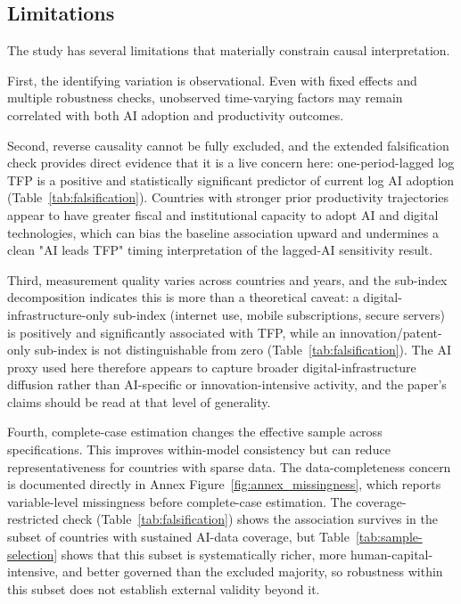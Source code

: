 \subsection{Limitations}

The study has several limitations that materially constrain causal interpretation.

First, the identifying variation is observational. Even with fixed effects and multiple robustness checks, unobserved time-varying factors may remain correlated with both AI adoption and productivity outcomes.

Second, reverse causality cannot be fully excluded, and the extended falsification check provides direct evidence that it is a live concern here: one-period-lagged log TFP is a positive and statistically significant predictor of current log AI adoption (Table~\ref{tab:falsification}). Countries with stronger prior productivity trajectories appear to have greater fiscal and institutional capacity to adopt AI and digital technologies, which can bias the baseline association upward and undermines a clean "AI leads TFP" timing interpretation of the lagged-AI sensitivity result.

Third, measurement quality varies across countries and years, and the sub-index decomposition indicates this is more than a theoretical caveat: a digital-infrastructure-only sub-index (internet use, mobile subscriptions, secure servers) is positively and significantly associated with TFP, while an innovation/patent-only sub-index is not distinguishable from zero (Table~\ref{tab:falsification}). The AI proxy used here therefore appears to capture broader digital-infrastructure diffusion rather than AI-specific or innovation-intensive activity, and the paper's claims should be read at that level of generality.

Fourth, complete-case estimation changes the effective sample across specifications. This improves within-model consistency but can reduce representativeness for countries with sparse data. The data-completeness concern is documented directly in Annex Figure~\ref{fig:annex_missingness}, which reports variable-level missingness before complete-case estimation. The coverage-restricted check (Table~\ref{tab:falsification}) shows the association survives in the subset of countries with sustained AI-data coverage, but Table~\ref{tab:sample-selection} shows that this subset is systematically richer, more human-capital-intensive, and better governed than the excluded majority, so robustness within this subset does not establish external validity beyond it.

